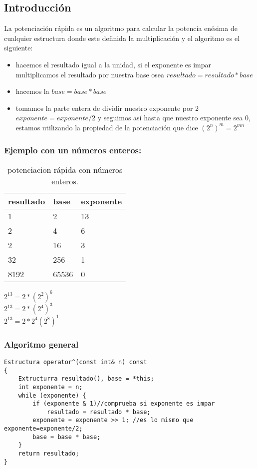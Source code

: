 \subsection{Introducción}
La potenciación rápida es un algoritmo para calcular la potencia enésima de cualquier estructura donde este definida la multiplicación y el algoritmo es el siguiente:
\begin{itemize}
\item hacemos el resultado igual a la unidad, si el exponente es impar multiplicamos el resultado por nuestra base  osea $resultado = resultado * base$
\item hacemos la $base =  base * base$
\item tomamos la parte entera de dividir nuestro exponente por 2 $exponente=exponente/2$  y seguimos así hasta que nuestro exponente sea 0, estamos utilizando la propiedad de la potenciación que dice $\left ( 2^{n} \right )^m=2^{mn}$
\end{itemize}

\subsubsection{Ejemplo con un números enteros:}

\begin{table}[htbp]
\begin{center}
\begin{tabular}{|l|l|l|}
\hline
resultado & base & exponente \\
\hline \hline
1 &	2 &	13 \\ \hline
2 &	4 &	6 \\ \hline
2	& 16 & 3 \\ \hline
32 &	256 &	1 \\ \hline
8192 &	65536 &	0 \\ \hline
\end{tabular}
\caption{potenciacion rápida con números enteros.}
\label{tabla:ejemplo}
\end{center}
\end{table}
$2^{13}=2*\left ( 2^{2} \right )^{6}$
\\$2^{13}=2*\left ( 2^{4} \right )^3$
\\$2^{13}=2*2^{4}\left ( 2^{8} \right )^1$


\subsubsection{Algoritmo general}
\begin{minipage}{\textwidth}
\begin{lstlisting}[style=C,caption=operadorPotencia]
Estructura operator^(const int& n) const
{
    Extructurra resultado(), base = *this;
    int exponente = n;
    while (exponente) {
        if (exponente & 1)//comprueba si exponente es impar
            resultado = resultado * base;
        exponente = exponente >> 1; //es lo mismo que exponente=exponente/2;
        base = base * base;
    }
    return resultado;
}
\end{lstlisting}
\end{minipage}
